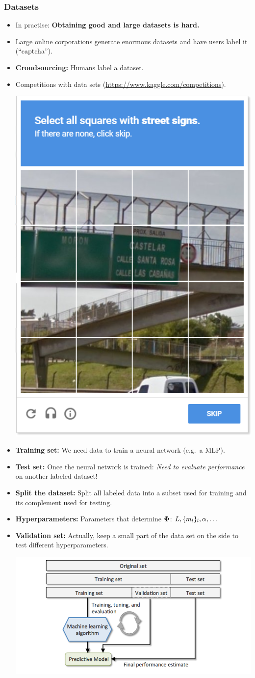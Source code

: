 \documentclass[10pt,hyperref={pdfpagelabels=false}]{beamer}
\begin{document}
\begin{frame}[allowframebreaks]
    \frametitle{Datasets}
    \begin{itemize}
        \item In practise: {\bf Obtaining good and large datasets is hard.}
        \item Large online corporations generate enormous datasets and have users label it (``captcha'').
        \item {\bf Croudsourcing:} Humans label a dataset.
        \item Competitions with data sets (\url{https://www.kaggle.com/competitions}).

        \includegraphics[width=.25\textwidth]{figures/recaptcha.png}
        \framebreak
        \item {\bf Training set:} We need data to train a neural network (e.g.~a MLP).
        \item {\bf Test set:} Once the neural network is trained: \emph{Need to evaluate performance} on another labeled dataset!
        \item {\bf Split the dataset:} Split all labeled data into a subset used for training and its complement used for testing.
        \item {\bf Hyperparameters:} Parameters that determine $\boldsymbol{\Phi}$: $L, \{m_l\}_l, \alpha, \dots$
        \item {\bf Validation set:} Actually, keep a small part of the data set on the side to test different hyperparameters.

        \framebreak
        \includegraphics[width=\textwidth]{figures/testtrain.png}
    \end{itemize}
\end{frame}
\end{document}
